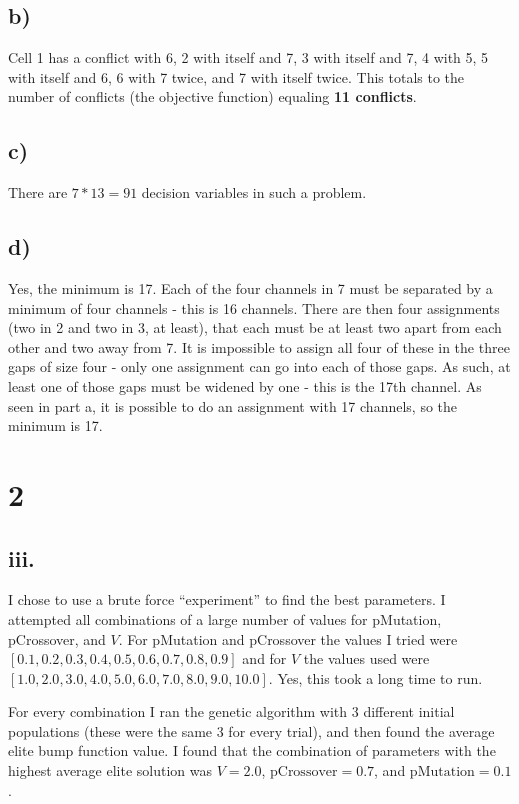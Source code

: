 \documentclass[12pt]{article}
\begin{document}
\subsection{b)}
Cell 1 has a conflict with 6, 2 with itself and 7, 3 with itself and 7, 4 with 5, 5 with itself and 6, 6 with 7 twice, and 7 with itself twice. This totals to the number of conflicts (the objective function) equaling \textbf{11 conflicts}.

\subsection{c)}
There are $7 * 13 = 91$ decision variables in such a problem.

\subsection{d)}
Yes, the minimum is 17. Each of the four channels in 7 must be separated by a minimum of four channels - this is 16 channels. There are then four assignments (two in 2 and two in 3, at least), that each must be at least two apart from  each other and two away from 7. It is impossible to assign all four of these in the three gaps of size four - only one assignment can go into each of those gaps. As such, at least one of those gaps must be widened by one - this is the 17th channel. As seen in part a, it is possible to do an assignment with 17 channels, so the minimum is 17.

\newpage
\section{2}
\subsection{iii.}
I chose to use a brute force ``experiment'' to find the best parameters.  I attempted all combinations of a large number of values for pMutation, pCrossover, and $V$.  For pMutation and pCrossover the values I tried were $[0.1, 0.2, 0.3, 0.4, 0.5, 0.6, 0.7, 0.8, 0.9]$ and for $V$ the values used were $[1.0, 2.0, 3.0, 4.0, 5.0, 6.0, 7.0, 8.0, 9.0, 10.0]$.  Yes, this took a long time to run.

For every combination I ran the genetic algorithm with 3 different initial populations (these were the same 3 for every trial), and then found the average elite bump function value.  I found that the combination of parameters with the highest average elite solution was $V=2.0$, $\text{pCrossover} =0.7$, and $\text{pMutation} =0.1$.
\end{document}
